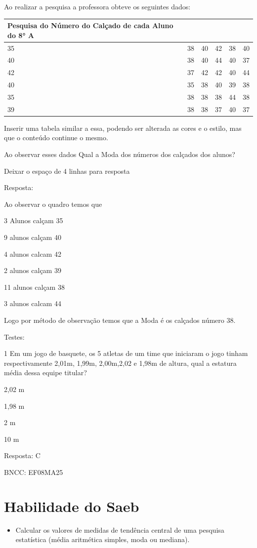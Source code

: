 Ao realizar a pesquisa a professora obteve os seguintes dados:

\begin{longtable}[]{@{}llllll@{}}
\toprule
Pesquisa do Número do Calçado de cada Aluno do 8° A & & & &
&\tabularnewline
\midrule
\endhead
35 & 38 & 40 & 42 & 38 & 40\tabularnewline
40 & 38 & 40 & 44 & 40 & 37\tabularnewline
42 & 37 & 42 & 42 & 40 & 44\tabularnewline
40 & 35 & 38 & 40 & 39 & 38\tabularnewline
35 & 38 & 38 & 38 & 44 & 38\tabularnewline
39 & 38 & 38 & 37 & 40 & 37\tabularnewline
\bottomrule
\end{longtable}

Inserir uma tabela similar a essa, podendo ser alterada as cores e o
estilo, mas que o conteúdo continue o mesmo.

Ao observar esses dados Qual a Moda dos números dos calçados dos alunos?

Deixar o espaço de 4 linhas para resposta

Resposta:

Ao observar o quadro temos que

3 Alunos calçam 35

9 alunos calçam 40

4 alunos calcam 42

2 alunos calçam 39

11 alunos calçam 38

3 alunos calcam 44

Logo por método de observação temos que a Moda é os calçados número 38.

Testes:

\num{1} Em um jogo de basquete, os 5 atletas de um time que iniciaram o jogo
tinham respectivamente 2,01m, 1,99m, 2,00m,2,02 e 1,98m de altura, qual
a estatura média dessa equipe titular?

\item 2,02 m
\item 1,98 m
\item 2 m
\item 10 m

Resposta: C

BNCC: EF08MA25

\section{Habilidade do Saeb}

\begin{itemize}
\tightlist

\item 
  Calcular os valores de medidas de tendência central de uma pesquisa
  estatística (média aritmética simples, moda ou mediana).
\end{itemize}

